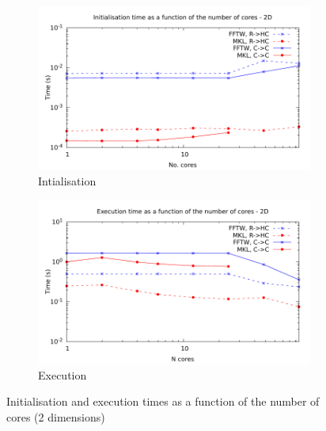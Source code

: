 \documentclass[12pt, a4paper]{article}
\begin{document}
\begin{figure}[H]
\captionsetup{width=0.8\linewidth}
\centering
\begin{subfigure}{.5\textwidth}
\centering
\includegraphics[width=.9\linewidth]{graphs/mpi-multh-init-2d.pdf}
\caption{Intialisation}
\label{2DMPIMULTHI}
\end{subfigure}%
\begin{subfigure}{.5\textwidth}
\centering
\includegraphics[width=.9\linewidth]{graphs/mpi-multh-exec-2d.pdf}
\caption{Execution}
\label{2DMPIMULTHE}
\end{subfigure}
\caption{Initialisation and execution times as a function of the number of cores (2 dimensions)}
\label{2DMPIMULTH}
\end{figure}
\end{document}
